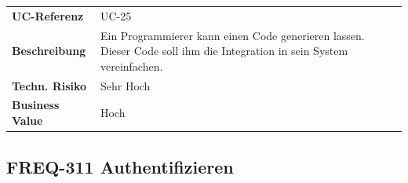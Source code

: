 \begin{longtable}[c]{@{}ll@{}}
\toprule
\begin{minipage}[t]{0.20\columnwidth}\raggedright\strut
\textbf{UC-Referenz}
\strut\end{minipage} &
\begin{minipage}[t]{0.74\columnwidth}\raggedright\strut
UC-25
\strut\end{minipage}\tabularnewline
\begin{minipage}[t]{0.20\columnwidth}\raggedright\strut
\textbf{Beschreibung}
\strut\end{minipage} &
\begin{minipage}[t]{0.74\columnwidth}\raggedright\strut
Ein Programmierer kann einen Code generieren lassen. Dieser Code soll
ihm die Integration in sein System vereinfachen.
\strut\end{minipage}\tabularnewline
\begin{minipage}[t]{0.20\columnwidth}\raggedright\strut
\textbf{Techn. Risiko}
\strut\end{minipage} &
\begin{minipage}[t]{0.74\columnwidth}\raggedright\strut
Sehr Hoch
\strut\end{minipage}\tabularnewline
\begin{minipage}[t]{0.20\columnwidth}\raggedright\strut
\textbf{Business Value}
\strut\end{minipage} &
\begin{minipage}[t]{0.74\columnwidth}\raggedright\strut
Hoch
\strut\end{minipage}\tabularnewline
\bottomrule
\end{longtable}

\subsection{FREQ-311 Authentifizieren}\label{freq-311-authentifizieren}

